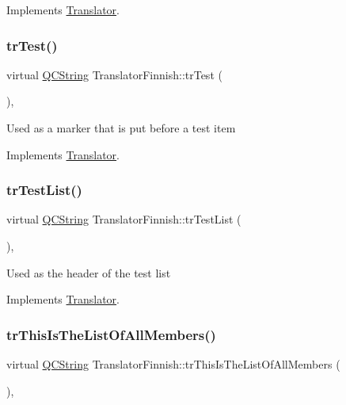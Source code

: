 Implements \mbox{\hyperlink{class_translator}{Translator}}.

\mbox{\label{class_translator_finnish_a5d977f3aa4f8024c9c5456044c295df6}} 
\subsubsection{\texorpdfstring{trTest()}{trTest()}}
{\footnotesize\ttfamily virtual \mbox{\hyperlink{class_q_c_string}{Q\+C\+String}} Translator\+Finnish\+::tr\+Test (\begin{DoxyParamCaption}{ }\end{DoxyParamCaption})\hspace{0.3cm}{\ttfamily [inline]}, {\ttfamily [virtual]}}

Used as a marker that is put before a test item 

Implements \mbox{\hyperlink{class_translator}{Translator}}.

\mbox{\label{class_translator_finnish_a6cffe6746d3b653cfc81831150f0f370}} 
\subsubsection{\texorpdfstring{trTestList()}{trTestList()}}
{\footnotesize\ttfamily virtual \mbox{\hyperlink{class_q_c_string}{Q\+C\+String}} Translator\+Finnish\+::tr\+Test\+List (\begin{DoxyParamCaption}{ }\end{DoxyParamCaption})\hspace{0.3cm}{\ttfamily [inline]}, {\ttfamily [virtual]}}

Used as the header of the test list 

Implements \mbox{\hyperlink{class_translator}{Translator}}.

\mbox{\label{class_translator_finnish_a5db5131f8e21568fb10b617b507f7795}} 
\subsubsection{\texorpdfstring{trThisIsTheListOfAllMembers()}{trThisIsTheListOfAllMembers()}}
{\footnotesize\ttfamily virtual \mbox{\hyperlink{class_q_c_string}{Q\+C\+String}} Translator\+Finnish\+::tr\+This\+Is\+The\+List\+Of\+All\+Members (\begin{DoxyParamCaption}{ }\end{DoxyParamCaption})\hspace{0.3cm}{\ttfamily [inline]}, {\ttfamily [virtual]}}

